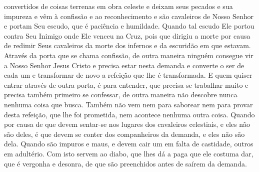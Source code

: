 convertidos de coisas terrenas em obra celeste e deixam seus pecados e sua
impureza e vêm à confissão e ao reconhecimento e são cavaleiros de Nosso Senhor
e portam Seu escudo, que é paciência e humildade. Quando tal escudo
Ele portou contra Seu Inimigo onde Ele venceu na Cruz, pois que dirigiu a morte
por causa de redimir Seus cavaleiros da morte dos infernos e da escuridão em
que estavam. Através da porta que se chama confissão, de outra maneira ninguém
consegue vir a Nosso Senhor Jesus Cristo e precisa estar nesta demanda e
converte o ser de cada um e transformar de novo a refeição que lhe é
transformada. E quem quiser entrar através de outra porta, é para entender, que
precisa se trabalhar muito e precisa também primeiro se confessar, de outra
maneira não descobre nunca nenhuma coisa que busca. Também não vem nem para
saborear nem para provar desta refeição, que lhe foi prometida, nem acontece
nenhuma outra coisa. Quando por causa de que devem sentar-se nos lugares dos
cavaleiros celestiais, e eles não são deles, é que devem se conter dos
companheiros da demanda, e eles não são dela. Quando são impuros e maus, e
devem cair um em falta de castidade, outros em adultério. Com isto servem ao
diabo, que lhes dá a paga que ele costuma dar, que é vergonha e desonra, de que
são preenchidos antes de saírem da demanda.

